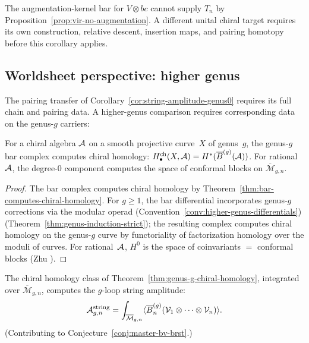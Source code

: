 The augmentation-kernel bar for $V\otimes bc$ cannot supply $T_n$ by Proposition~\ref{prop:vir-no-augmentation}.
A different unital chiral target requires its own construction, relative descent, insertion maps, and pairing homotopy before this corollary applies.

\subsection{Worldsheet perspective: higher genus}

The pairing transfer of Corollary~\ref{cor:string-amplitude-genus0} requires its full chain and pairing data. A higher-genus comparison requires corresponding data on the genus-$g$ carriers:

\begin{theorem}
\label{thm:genus-g-chiral-homology}
For a chiral algebra $\mathcal{A}$ on a smooth projective
curve~$X$ of genus~$g$, the genus-$g$ bar complex
computes chiral homology:
$H_\bullet^{\mathrm{ch}}(X, \mathcal{A})
= H^*(\overline{B}^{(g)}(\mathcal{A}))$.
For rational~$\mathcal{A}$, the degree-$0$ component computes
the space of conformal blocks on
$\overline{\mathcal{M}}_{g,n}$.
\end{theorem}

\begin{proof}
The bar complex computes chiral homology by
Theorem~\ref{thm:bar-computes-chiral-homology}.
For $g \geq 1$, the bar differential incorporates
genus-$g$ corrections via the modular operad
(Convention~\ref{conv:higher-genus-differentials})
(Theorem~\ref{thm:genus-induction-strict}); the
resulting complex computes chiral homology on the
genus-$g$ curve by functoriality of factorization
homology over the moduli of curves.  For rational~$\mathcal{A}$,
$H^0$ is the space of coinvariants $=$ conformal blocks
(Zhu \cite{Zhu96}).
\end{proof}

\begin{conjecture}
\label{conj:string-amplitude-higher-genus}
The chiral homology class of
Theorem~\ref{thm:genus-g-chiral-homology}, integrated
over $\overline{\mathcal{M}}_{g,n}$, computes the
$g$-loop string amplitude:
\[
\mathcal{A}_{g,n}^{\mathrm{string}}
= \int_{\overline{\mathcal{M}}_{g,n}}
\langle \overline{B}^{(g)}_n
(\mathcal{V}_1 \otimes \cdots
\otimes \mathcal{V}_n) \rangle.
\]
(Contributing to Conjecture~\ref{conj:master-bv-brst}.)
\end{conjecture}

